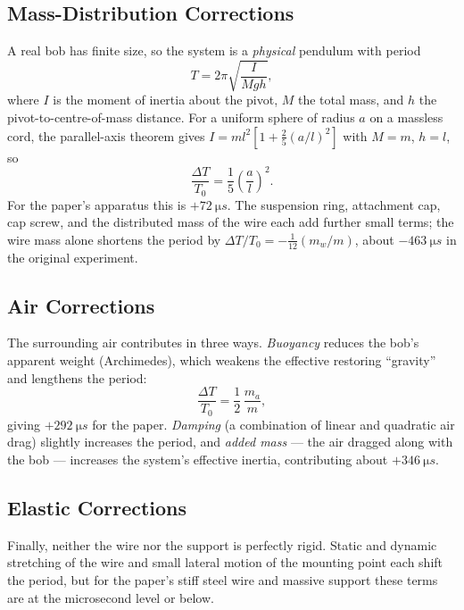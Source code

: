 \documentclass[11pt]{article}
\begin{document}
\subsection{Mass-Distribution Corrections}
A real bob has finite size, so the system is a \emph{physical} pendulum with period
\begin{equation}
T = 2\pi\sqrt{\frac{I}{Mgh}},
\label{eq:physpend}
\end{equation}
where $I$ is the moment of inertia about the pivot, $M$ the total mass, and $h$ the
pivot-to-centre-of-mass distance. For a uniform sphere of radius $a$ on a massless cord,
the parallel-axis theorem gives $I = ml^2\!\left[1+\tfrac{2}{5}(a/l)^2\right]$ with $M=m$,
$h=l$, so
\begin{equation}
\frac{\Delta T}{T_0} = \frac{1}{5}\left(\frac{a}{l}\right)^{2}.
\label{eq:radius}
\end{equation}
For the paper's apparatus this is $+\SI{72}{\micro s}$. The suspension ring, attachment
cap, cap screw, and the distributed mass of the wire each add further small terms; the
wire mass alone shortens the period by $\Delta T/T_0 = -\tfrac{1}{12}(m_w/m)$, about
$-\SI{463}{\micro s}$ in the original experiment.

\subsection{Air Corrections}
The surrounding air contributes in three ways. \emph{Buoyancy} reduces the bob's apparent
weight (Archimedes), which weakens the effective restoring ``gravity'' and lengthens the
period:
\begin{equation}
\frac{\Delta T}{T_0} = \frac{1}{2}\,\frac{m_a}{m},
\label{eq:buoyancy}
\end{equation}
giving $+\SI{292}{\micro s}$ for the paper. \emph{Damping} (a combination of linear and
quadratic air drag) slightly increases the period, and \emph{added mass} --- the air
dragged along with the bob --- increases the system's effective inertia, contributing
about $+\SI{346}{\micro s}$.

\subsection{Elastic Corrections}
Finally, neither the wire nor the support is perfectly rigid. Static and dynamic stretching
of the wire and small lateral motion of the mounting point each shift the period, but for
the paper's stiff steel wire and massive support these terms are at the microsecond level
or below.
\end{document}
